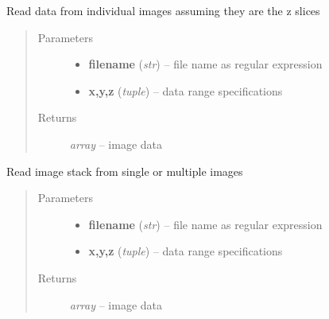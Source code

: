 \documentclass[letterpaper,10pt,english]{sphinxmanual}
\begin{document}

\begin{fulllineitems}
\label{api/ClearMap.IO:ClearMap.IO.FileList.readDataFiles}
Read data from individual images assuming they are the z slices
\begin{quote}\begin{description}
\item[{Parameters}] \leavevmode\begin{itemize}
\item {} 
\textbf{filename} (\emph{str}) --
file name as regular expression

\item {} 
\textbf{x,y,z} (\emph{tuple}) --
data range specifications

\end{itemize}

\item[{Returns}] \leavevmode
\emph{array} --
image data

\end{description}\end{quote}

\end{fulllineitems}


\begin{fulllineitems}
\label{api/ClearMap.IO:ClearMap.IO.FileList.readData}
Read image stack from single or multiple images
\begin{quote}\begin{description}
\item[{Parameters}] \leavevmode\begin{itemize}
\item {} 
\textbf{filename} (\emph{str}) --
file name as regular expression

\item {} 
\textbf{x,y,z} (\emph{tuple}) --
data range specifications

\end{itemize}

\item[{Returns}] \leavevmode
\emph{array} --
image data

\end{description}\end{quote}

\end{fulllineitems}
\end{document}
